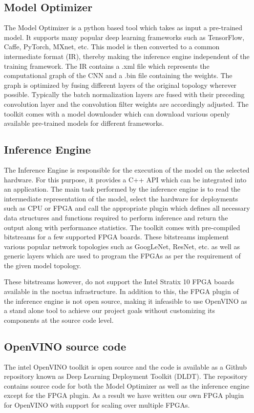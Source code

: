 \subsection{Model Optimizer}
The Model Optimizer is a python based tool which takes as input a pre-trained model. It supports many popular deep learning frameworks such as TensorFlow, Caffe, PyTorch, MXnet, etc. This model is then converted to a common intermediate format (IR), thereby making the inference engine independent of the training framework. The IR contains a .xml file which represents the computational graph of the CNN and a .bin file containing the weights. The graph is optimized by fusing different layers of the original topology wherever possible. Typically the batch normalization layers are fused with their preceding convolution layer and the convolution filter weights are accordingly adjusted. The toolkit comes with a model downloader which can download various openly available pre-trained models for different frameworks.
 

 \subsection{Inference Engine}
 The Inference Engine is responsible for the execution of the model on the selected hardware. For this purpose, it provides a C++ API which can be integrated into an application. The main task performed by the inference engine is to read the intermediate representation of the model, select the hardware for deployments such as CPU or FPGA and call the appropriate plugin which defines all necessary data structures and functions required to perform inference and return the output along with performance statistics. 
 The toolkit comes with pre-compiled bitstreams for a few supported FPGA boards. These bitstreams implement various popular network topologies such as GoogLeNet, ResNet, etc. as well as generic layers which are used to program the FPGAs as per the requirement of the given model topology.
 
 These bitstreams however, do not support the Intel Stratix 10 FPGA boards available in the noctua infrastructure. In addition to this, the FPGA plugin of the inference engine is not open source, making it infeasible to use OpenVINO as a stand alone tool to achieve our project goals without customizing its components at the source code level.
 
 \subsection{OpenVINO source code}
 The intel OpenVINO toolkit is open source and the code is available as a Github repository known as Deep Learning Deployment Toolkit (DLDT). The repository contains source code for both the Model Optimizer as well as the inference engine except for the FPGA plugin. As a result we have written our own FPGA plugin for OpenVINO with support for scaling over multiple FPGAs. 
 
